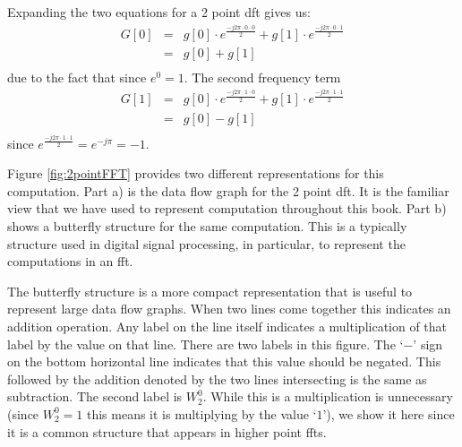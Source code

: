 Expanding the two equations for a 2 point \gls{dft} gives us:
\begin{equation}
\begin{array} {lll} 
G[0] & = & g[0] \cdot e^{\frac{-j 2 \pi \cdot 0 \cdot 0}{2}} + g[1] \cdot e^{\frac{-j 2 \pi \cdot 0 \cdot 1}{2}} \\
 & = & g[0] + g[1] \\
\end{array}
\label{eq:2ptlower}
\end{equation} due to the fact that since  $e^{0}  =  1$. The second frequency term
\begin{equation}
\begin{array} {lll} 
G[1] & = & g[0] \cdot e^{\frac{-j 2 \pi \cdot 1 \cdot 0}{2}} + g[1] \cdot e^{\frac{-j 2 \pi \cdot 1 \cdot 1}{2}} \\
 & = & g[0] - g[1] \\
\end{array}
\label{eq:2pthigher}
\end{equation} since  $e^{\frac{-j 2 \pi \cdot 1 \cdot 1}{2}}  = e^{-j \pi } = -1$.

Figure \ref{fig:2pointFFT} provides two different representations for this computation.  Part a) is the data flow graph for the 2 point \gls{dft}. It is the familiar view that we have used to represent computation throughout this book. Part b) shows a butterfly structure for the same computation. This is a typically structure used in digital signal processing, in particular, to represent the computations in an \gls{fft}. 

The butterfly structure is a more compact representation that is useful to represent large data flow graphs. When two lines come together this indicates an addition operation. Any label on the line itself indicates a multiplication of that label by the value on that line. There are two labels in this figure. The `$-$' sign on the bottom horizontal line indicates that this value should be negated. This followed by the addition denoted by the two lines intersecting is the same as subtraction. The second label is $W^0_2$. While this is a multiplication is unnecessary (since $W^0_2 = 1$ this means it is multiplying by the value `$1$'), we show it here since it is a common structure that appears in higher point \gls{fft}s.

